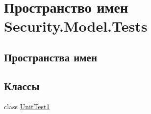 \hypertarget{namespace_security_1_1_model_1_1_tests}{}\section{Пространство имен Security.\+Model.\+Tests}
\label{namespace_security_1_1_model_1_1_tests}
\subsection*{Пространства имен}
\begin{DoxyCompactItemize}
\end{DoxyCompactItemize}
\subsection*{Классы}
\begin{DoxyCompactItemize}
\item 
class \hyperlink{class_security_1_1_model_1_1_tests_1_1_unit_test1}{Unit\+Test1}
\end{DoxyCompactItemize}
